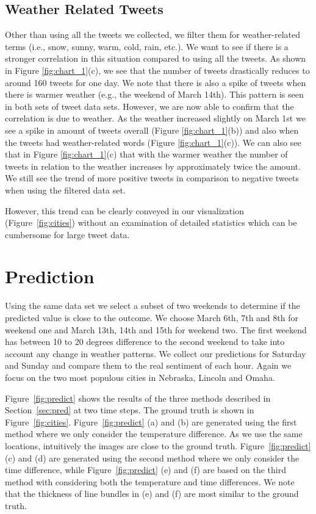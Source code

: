 \subsection{Weather Related Tweets}

Other than using all the tweets we collected, we filter them for weather-related terms (i.e., snow, sunny, warm, cold, rain, etc.). We want to see if there is a stronger correlation in this situation compared to using all the tweets. %
As shown in Figure \ref{fig:chart_1}(c), we see that the number of tweets drastically reduces to around 160 tweets for one day.
We note that there is also a spike of tweets when there is warmer weather (e.g., the weekend of March 14th). This pattern is seen in both sets of tweet data sets. However, we are now able to confirm that the correlation is due to weather. As the weather increased slightly on March 1st we see a spike in amount of tweets overall (Figure \ref{fig:chart_1}(b)) and also when the tweets had weather-related words (Figure \ref{fig:chart_1}(c)). We can also see that in Figure \ref{fig:chart_1}(c) that with the warmer weather the number of tweets in relation to the weather increases by approximately twice the amount. We still see the trend of more positive tweets in comparison to negative tweets when using the filtered data set.

However, this trend can be clearly conveyed in our visualization (Figure~\ref{fig:cities}) without an examination of detailed statistics which can be cumbersome for large tweet data.


\section{Prediction}
\label{sec:caseprediction}

Using the same data set we select a subset of two weekends to determine if the predicted value is close to the outcome. We choose March 6th, 7th and 8th for weekend one and March 13th, 14th and 15th for weekend two. The first weekend has between 10 to 20 degrees difference to the second weekend to take into account any change in weather patterns. We collect our predictions for Saturday and Sunday and compare them to the real sentiment of each hour. Again we focus on the two most populous cities in Nebraska, Lincoln and Omaha.

Figure~\ref{fig:predict} shows the results of the three methods described in Section~\ref{sec:pred} at two time steps. The ground truth is shown in Figure~\ref{fig:cities}. Figure~\ref{fig:predict} (a) and (b) are generated using the first method where we only consider the temperature difference. As we use the same locations, intuitively the images are close to the ground truth. Figure~\ref{fig:predict} (c) and (d) are generated using the second method where we only consider the time difference, while Figure~\ref{fig:predict} (e) and (f) are based on the third method with considering both the temperature and time differences. We note that the thickness of line bundles in (e) and (f) are most similar to the ground truth.

